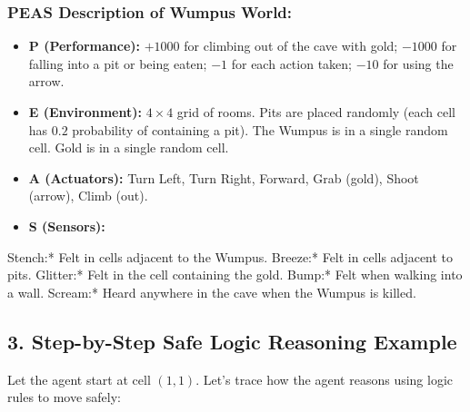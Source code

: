 \subsubsection{PEAS Description of Wumpus World:}
\begin{itemize}
  \item   \textbf{P (Performance):} $+1000$ for climbing out of the cave with gold; $-1000$ for falling into a pit or being eaten; $-1$ for each action taken; $-10$ for using the arrow.
  \item   \textbf{E (Environment):} $4 \times 4$ grid of rooms. Pits are placed randomly (each cell has $0.2$ probability of containing a pit). The Wumpus is in a single random cell. Gold is in a single random cell.
  \item   \textbf{A (Actuators):} Turn Left, Turn Right, Forward, Grab (gold), Shoot (arrow), Climb (out).
  \item   \textbf{S (Sensors):}
\end{itemize}
    \textit{   }Stench:* Felt in cells adjacent to the Wumpus.
    \textit{   }Breeze:* Felt in cells adjacent to pits.
    \textit{   }Glitter:* Felt in the cell containing the gold.
    \textit{   }Bump:* Felt when walking into a wall.
    \textit{   }Scream:* Heard anywhere in the cave when the Wumpus is killed.


\subsection{3. Step-by-Step Safe Logic Reasoning Example}
Let the agent start at cell $(1,1)$. Let's trace how the agent reasons using logic rules to move safely:

